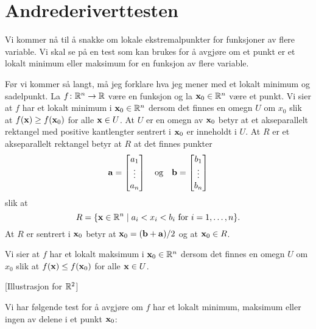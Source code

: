 \section*{Andrederiverttesten}

Vi kommer nå til å snakke om lokale ekstremalpunkter for funksjoner av flere
variable. Vi skal se på en test som kan brukes for å avgjøre om et punkt er et
lokalt minimum eller maksimum for en funksjon av flere variable.

Før vi kommer så langt, må jeg forklare hva jeg mener med et lokalt minimum og
sadelpunkt. La $f \colon \mathbb{R}^n \to \mathbb{R}$ være en funksjon
og la $\mathbf{x}_0 \in \mathbb{R}^n$ være et punkt.
Vi sier at $f$ har et lokalt minimum
i $\mathbf{x}_0 \in \mathbb{R}^n$ dersom det finnes
en omegn $U$ om $x_0$ slik at $f(\mathbf{x}) \geq f(\mathbf{x}_0)$ for alle $\mathbf{x} \in U$. 
At $U$ er en omegn av $\mathbf{x}_0$ betyr at et akseparallelt rektangel med positive kantlengter
sentrert i $\mathbf{x}_0$ er inneholdt i $U$.
At $R$ er et akseparallelt rektangel betyr at $R$
at det finnes punkter
$$\mathbf{a} = \begin{bmatrix} a_1 \\ \vdots \\ a_n \end{bmatrix} \quad \text{og} \quad
\mathbf{b} = \begin{bmatrix} b_1 \\ \vdots \\ b_n \end{bmatrix}$$
slik at
$$R = \{ \mathbf{x} \in \mathbb{R}^n \mid a_i < x_i < b_i \text{ for } i = 1, \ldots, n \}.$$
At $R$ er sentrert i $\mathbf{x}_0$ betyr at $\mathbf{x}_0 = (\mathbf{b} + \mathbf{a}) / 2$ og at $\mathbf{x}_0 \in R$.


Vi sier at $f$ har et lokalt maksimum
i $\mathbf{x}_0 \in \mathbb{R}^n$ dersom det finnes
en omegn $U$ om $x_0$ slik at $f(\mathbf{x}) \leq f(\mathbf{x}_0)$ for alle $\mathbf{x} \in U$. 

[Illustrasjon for $\mathbb{R}^2$]

Vi har følgende test for å avgjøre om $f$ har et lokalt minimum,
maksimum eller ingen av delene i et punkt $\mathbf{x}_0$:

